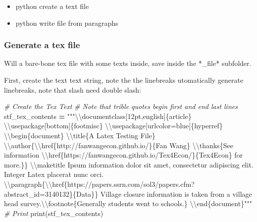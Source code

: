 \documentclass[
]{book}
\newenvironment{Shaded}{\begin{snugshade}}{\end{snugshade}}
\newcommand{\BuiltInTok}[1]{#1}
\newcommand{\CharTok}[1]{\textcolor[rgb]{0.31,0.60,0.02}{#1}}
\newcommand{\CommentTok}[1]{\textcolor[rgb]{0.56,0.35,0.01}{\textit{#1}}}
\newcommand{\NormalTok}[1]{#1}
\newcommand{\OperatorTok}[1]{\textcolor[rgb]{0.81,0.36,0.00}{\textbf{#1}}}
\newcommand{\SpecialCharTok}[1]{\textcolor[rgb]{0.00,0.00,0.00}{#1}}
\newcommand{\StringTok}[1]{\textcolor[rgb]{0.31,0.60,0.02}{#1}}
\providecommand{\tightlist}{%
  \setlength{\itemsep}{0pt}\setlength{\parskip}{0pt}}
\begin{document}
\begin{itemize}
\tightlist
\item
  python create a text file
\item
  python write file from paragraphs
\end{itemize}

\hypertarget{generate-a-tex-file}{%
\subsubsection{Generate a tex file}\label{generate-a-tex-file}}

Will a bare-bone tex file with some texts inside, save inside the *\_file* subfolder.

First, create the text text string, note the the linebreaks utomatically generate linebreaks, note that slash need double slash:

\begin{Shaded}
\begin{Highlighting}[]
\CommentTok{# Create the Tex Text}
\CommentTok{# Note that trible quotes begin first and end last lines}
\NormalTok{stf_tex_contents }\OperatorTok{=} \StringTok{"""}\CharTok{\textbackslash{}\textbackslash{}}\StringTok{documentclass[12pt,english]}\SpecialCharTok{\{article\}}
\CharTok{\textbackslash{}\textbackslash{}}\StringTok{usepackage[bottom]}\SpecialCharTok{\{footmisc\}}
\CharTok{\textbackslash{}\textbackslash{}}\StringTok{usepackage[urlcolor=blue]}\SpecialCharTok{\{hyperref\}}
\CharTok{\textbackslash{}\textbackslash{}}\StringTok{begin}\SpecialCharTok{\{document\}}
\CharTok{\textbackslash{}\textbackslash{}}\StringTok{title\{A Latex Testing File\}}
\CharTok{\textbackslash{}\textbackslash{}}\StringTok{author\{}\CharTok{\textbackslash{}\textbackslash{}}\StringTok{href\{http://fanwangecon.github.io/\}\{Fan Wang\} }\CharTok{\textbackslash{}\textbackslash{}}\StringTok{thanks\{See information }\CharTok{\textbackslash{}\textbackslash{}}\StringTok{href\{https://fanwangecon.github.io/Tex4Econ/\}}\SpecialCharTok{\{Tex4Econ\}}\StringTok{ for more.}\SpecialCharTok{\}\}}
\CharTok{\textbackslash{}\textbackslash{}}\StringTok{maketitle}
\StringTok{Ipsum information dolor sit amet, consectetur adipiscing elit. Integer Latex placerat nunc orci.}
\CharTok{\textbackslash{}\textbackslash{}}\StringTok{paragraph\{}\CharTok{\textbackslash{}\textbackslash{}}\StringTok{href\{https://papers.ssrn.com/sol3/papers.cfm?abstract_id=3140132\}}\SpecialCharTok{\{Data\}}\StringTok{\}}
\StringTok{Village closure information is taken from a village head survey.}\CharTok{\textbackslash{}\textbackslash{}}\StringTok{footnote\{Generally students went to schools.\}}
\CharTok{\textbackslash{}\textbackslash{}}\StringTok{end}\SpecialCharTok{\{document\}}\StringTok{"""}
\CommentTok{# Print}
\BuiltInTok{print}\NormalTok{(stf_tex_contents)}
\end{Highlighting}
\end{Shaded}
\end{document}
